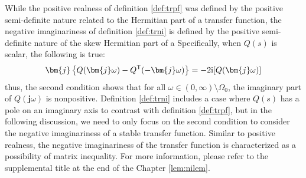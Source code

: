 \documentclass[graybox, envcountchap]{svmult}
\begin{document}
While the positive realness of definition \ref{def:trpf} was defined by the positive semi-definite nature related to the Hermitian part of a transfer function, the negative imaginariness of definition \ref{def:trni} is defined by the positive semi-definite nature of the skew Hermitian part of a
Specifically, when $Q(s)$ is scalar, the following is true:
\begin{align*}
\bm{j}\left\{Q(\bm{j} \omega) - Q^{\sf T}(-\bm{j} \omega) \right\}
= -2 \imag[Q(\bm{j} \omega)]
\end{align*}
thus, the second condition shows that for all $\omega \in (0,\infty)\setminus \Omega_0$, the imaginary part of $Q(\bm{j}\omega)$ is nonpositive.
Definition \ref{def:trni} includes a case where $Q(s)$ has a pole on an imaginary axis to contrast with definition \ref{def:trpf}, but in the following discussion, we need to only focus on the second condition to consider the negative imaginariness of a stable transfer function.
Similar to positive realness, the negative imaginariness of the transfer function is characterized as a possibility of matrix inequality. 
For more information, please refer to the supplemental title at the end of the Chapter \ref{lem:nilem}.
\end{document}
